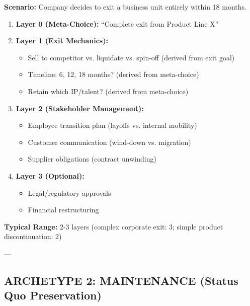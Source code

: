 \documentclass[11pt, a4paper]{article}
\begin{document}
\begin{tcolorbox}[colback=gray!5!white, colframe=gray!75!black, title=Example: Organizational Spin-off or Divestiture]

\textbf{Scenario:} Company decides to exit a business unit entirely within 18 months.

\begin{enumerate}
    \item \textbf{Layer 0 (Meta-Choice):} ``Complete exit from Product Line X''

    \item \textbf{Layer 1 (Exit Mechanics):}
    \begin{itemize}[nosep]
        \item Sell to competitor vs. liquidate vs. spin-off (derived from exit goal)
        \item Timeline: 6, 12, 18 months? (derived from meta-choice)
        \item Retain which IP/talent? (derived from meta-choice)
    \end{itemize}

    \item \textbf{Layer 2 (Stakeholder Management):}
    \begin{itemize}[nosep]
        \item Employee transition plan (layoffs vs. internal mobility)
        \item Customer communication (wind-down vs. migration)
        \item Supplier obligations (contract unwinding)
    \end{itemize}

    \item \textbf{Layer 3 (Optional):}
    \begin{itemize}[nosep]
        \item Legal/regulatory approvals
        \item Financial restructuring
    \end{itemize}
\end{enumerate}

\textbf{Typical Range:} 2-3 layers (complex corporate exit: 3; simple product discontinuation: 2)

\end{tcolorbox}

---

\subsection{ARCHETYPE 2: MAINTENANCE (Status Quo Preservation)}
\end{document}
